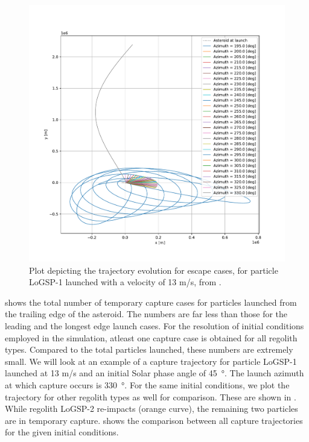 \begin{figure}[htb]
\centering
\captionsetup{justification=centering}
\includegraphics[width=\textwidth, height=0.4\textheight, keepaspectratio=true]{trailing_edge_perturbations/logsp1_escape_traj_13ms_solarPhase225.pdf}
\caption{Plot depicting the trajectory evolution for escape cases, for particle LoGSP-1 launched with a velocity of 13 m/s, from \protect{}.}
\label{fig:trailingEdge_logsp1_escape_traj_13ms_solar225}
\end{figure}
\FloatBarrier
 shows the total number of temporary capture cases for particles launched from the trailing edge of the asteroid. The numbers are far less than those for the leading and the longest edge launch cases. For the resolution of initial conditions employed in the simulation, atleast one capture case is obtained for all regolith types. Compared to the total particles launched, these numbers are extremely small. We will look at an example of a capture trajectory for particle LoGSP-1 launched at 13 m/s and an initial Solar phase angle of \SI{45}{\degree}. The launch azimuth at which capture occurs is \SI{330}{\degree}. For the same initial conditions, we plot the trajectory for other regolith types as well for comparison. These are shown in . While regolith LoGSP-2 re-impacts (orange curve), the remaining two particles are in temporary capture.  shows the comparison between all capture trajectories for the given initial conditions.
